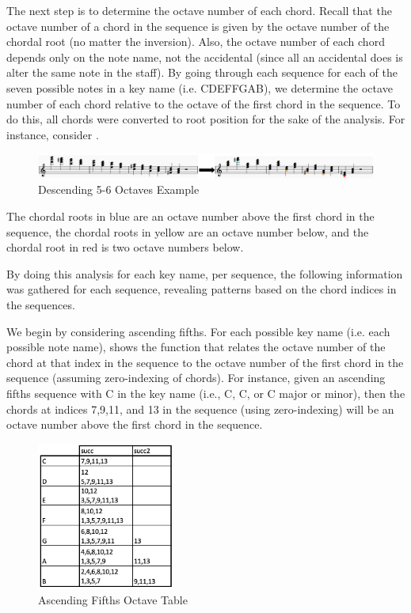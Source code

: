 \documentclass{report}
\begin{document}
The next step is to determine the octave number of each chord. Recall that the octave number of a chord in the sequence is given by the octave number of the chordal root (no matter the inversion). Also, the octave number of each chord depends only on the note name, not the accidental (since all an accidental does is alter the same note in the staff). By going through each sequence for each of the seven possible notes in a key name (i.e. CDEFFGAB), we determine the octave number of each chord relative to the octave of the first chord in the sequence. To do this, all chords were converted to root position for the sake of the analysis. For instance, consider . 

\begin{figure}[h!]
\centering
\includegraphics[width=1.1\textwidth]{images/desc56-example}
  \caption{Descending 5-6 Octaves Example}
  \label{fig:desc56-example}
\end{figure}

The chordal roots in blue are an octave number above the first chord in the sequence,  the chordal roots in yellow are an octave number below, and the chordal  root in red is two octave numbers below.

By doing this analysis for each key name, per sequence, the following information was gathered for each sequence, revealing patterns based on the chord indices in the sequences.

We begin by considering ascending fifths. For each possible key name (i.e. each possible note name),  shows the function that relates the octave number of the chord at that index in the sequence to the octave number of the first chord in the sequence (assuming zero-indexing of chords). For instance, given an ascending fifths sequence with C in the key name (i.e., C\musFlat, C\musNatural, or C\musSharp \; major or minor), then the chords at indices 7,9,11, and 13 in the sequence (using zero-indexing) will be an octave number above the first chord in the sequence.

\begin{figure}[h!]
\centering
\includegraphics[width=0.4\textwidth]{images/asc_fifths_octave_grid}
  \caption{Ascending Fifths Octave Table}
  \label{fig:asc_fifths_octave_grid}
\end{figure}
\end{document}
